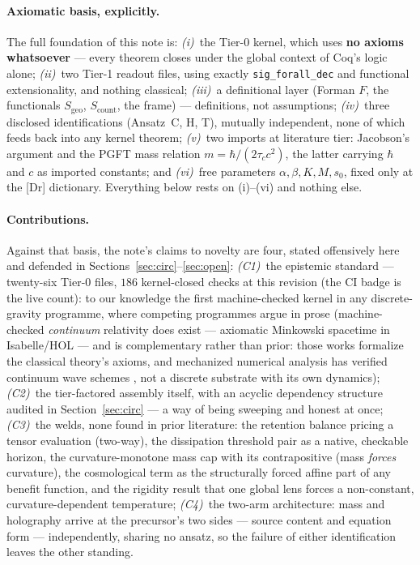 \documentclass[10pt,twocolumn]{article}
\theoremstyle{definition}
\newcommand{\Dr}{\textsf{[Dr]}}
\newcommand{\code}[1]{\texttt{#1}}
\begin{document}
\paragraph{Axiomatic basis, explicitly.} The full foundation of this note is:
\emph{(i)}~the Tier-0 kernel, which uses \textbf{no axioms whatsoever} --- every
theorem closes under the global context of Coq's logic alone;
\emph{(ii)}~two Tier-1 readout files, using exactly \code{sig\_forall\_dec} and
functional extensionality, and nothing classical;
\emph{(iii)}~a definitional layer (Forman $F$, the functionals $S_{\mathrm{geo}}$,
$S_{\mathrm{count}}$, the frame) --- definitions, not assumptions;
\emph{(iv)}~three disclosed identifications (Ansatz~C, H, T), mutually independent,
none of which feeds back into any kernel theorem;
\emph{(v)}~two imports at literature tier: Jacobson's argument and the PGFT mass
relation $m=\hbar/(2\tau_c c^2)$, the latter carrying $\hbar$ and $c$ as imported
constants; and \emph{(vi)}~free parameters $\alpha,\beta,K,M,s_0$, fixed only at
the \Dr{} dictionary. Everything below rests on (i)--(vi) and nothing else.

\paragraph{Contributions.} Against that basis, the note's claims to novelty are
four, stated offensively here and defended in Sections~\ref{sec:circ}--\ref{sec:open}:
\emph{(C1)}~the epistemic standard --- twenty-six Tier-0 files, $186$ kernel-closed checks at this revision (the CI
badge is the live count): to our knowledge the first machine-checked kernel in any discrete-gravity
programme, where competing programmes argue in prose (machine-checked
\emph{continuum} relativity does exist --- axiomatic Minkowski spacetime in
Isabelle/HOL \cite{schutzformal,stannett} --- and is complementary rather than
prior: those works formalize the classical theory's axioms, and mechanized numerical
analysis has verified continuum wave schemes \cite{boldo}, not a discrete substrate
with its own dynamics);
\emph{(C2)}~the tier-factored assembly itself, with an acyclic dependency structure
audited in Section~\ref{sec:circ} --- a way of being sweeping and honest at once;
\emph{(C3)}~the welds, none found in prior literature: the retention balance pricing
a tensor evaluation (two-way), the dissipation threshold pair as a native, checkable
horizon, the curvature-monotone mass cap with its contrapositive (mass \emph{forces}
curvature), the cosmological term as the structurally forced affine part of any
benefit function, and the rigidity result that one global lens forces a non-constant,
curvature-dependent temperature;
\emph{(C4)}~the two-arm architecture: mass and holography arrive at the
precursor's two sides --- source content and equation form --- independently, sharing
no ansatz, so the failure of either identification leaves the other standing.
\end{document}
